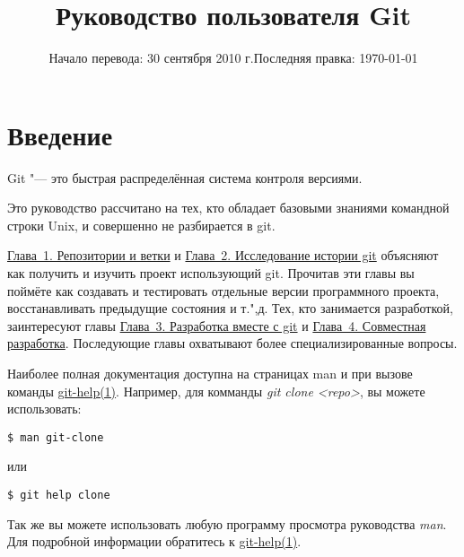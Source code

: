 \documentclass[a4paper, 12pt]{report}
\title{Руководство пользователя Git}
\date{Начало перевода: 30 сентября 2010 г.\linebreak Последняя правка: \today}
\begin{document}
\lstset{language=bash, 
		frame=trbl,
		frameround=tttt,
		basicstyle=\ttfamily\small , 
		keywordstyle=\textbf ,		
		commentstyle=\textit
		}

\maketitle
\tableofcontents


%
%
\newpage
\section*{Введение}
\hypertarget{#preface}{}

Git "--- это быстрая распределённая система контроля версиями.

Это руководство рассчитано на тех, кто обладает базовыми знаниями командной
строки Unix, и совершенно не разбирается в git.

\href{#chapter1}{Глава~1. Репозитории и ветки} и 
\href{#chapter2}{Глава~2. Исследование истории git} объясняют как 
получить и изучить проект использующий git. Прочитав эти главы вы поймёте как 
создавать и тестировать отдельные версии программного проекта, восстанавливать 
предыдущие состояния и т.",д. Тех, кто занимается разработкой, заинтересуют главы
\href{#chapter3}{Глава~3. Разработка вместе с git} и 
\href{#chapter4}{Глава~4. Совместная разработка}. Последующие главы 
охватывают более специализированные вопросы.

Наиболее полная документация доступна на страницах \textsf{man} и при вызове
команды \href{http://www.kernel.org/pub/software/scm/git/docs/git-help.html}
{git-help(1)}. Например, для комманды \emph{git clone <repo>}, вы 
можете использовать:

\begin{lstlisting}
$ man git-clone
\end{lstlisting}

или

\begin{lstlisting}
$ git help clone
\end{lstlisting}

Так же вы можете использовать любую программу просмотра руководства
\emph{man}.
Для подробной информации обратитесь к 
\href{http://www.kernel.org/pub/software/scm/git/docs/git-help.html}
{git-help(1)}.
\end{document}
